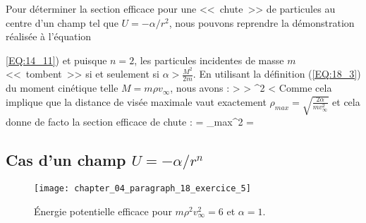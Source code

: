 Pour d\'eterminer la section efficace pour une <<~chute~>> de particules au centre d'un champ tel que $U = -\alpha / r^{2}$, nous pouvons reprendre la d\'emonstration r\'ealis\'ee à l'\'equation {\ref{EQ:14_11}) et puisque $n = 2$, les particules incidentes de masse $m$ <<~tombent~>> si et seulement si $\alpha > \frac{M^{2}}{2m}$. En utilisant la d\'efinition (\ref{EQ:18_3}) du moment cin\'etique telle $M = m\rho v_{\infty}$, nous avons :
\be
	\alpha >  \Leftrightarrow \alpha >  \Leftrightarrow \rho^{2} < 
\ee
Comme cela implique que la distance de vis\'ee maximale vaut exactement $\rho_{max} = \sqrt{\frac{2\alpha}{mv_{\infty}^{2}}}$ et cela donne de facto la section efficace de chute :
\be
	\sigma = \pi\rho_{max}^{2} = 
\ee

\subsection{Cas d'un champ $U = -\alpha / r^{n}$}

\begin{figure}[htb!]
	\begin{center}
		\texttt{[image: chapter\_04\_paragraph\_18\_exercice\_5]}
		\caption{\'Energie potentielle efficace pour $m\rho^{2}v_{\infty}^{2} = 6$ et $\alpha = 1$.}\label{FIG:4_18_5}
	\end{center}
\end{figure}

}
